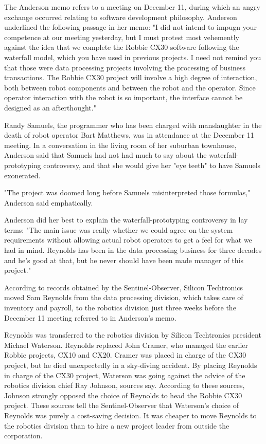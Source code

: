 The Anderson memo refers to a meeting on December 11, during which an angry exchange occurred relating to software development philosophy. Anderson underlined the following passage in her memo: "I did not intend to impugn your competence at our meeting yesterday, but I must protest most vehemently against the idea that we complete the Robbie CX30 software following the waterfall model, which you have used in previous projects. I need not remind you that those were data processing projects involving the processing of business transactions. The Robbie CX30 project will involve a high degree of interaction, both between robot components and between the robot and the operator. Since operator interaction with the robot is so important, the interface cannot be designed as an afterthought."

Randy Samuels, the programmer who has been charged with manslaughter in the death of robot operator Bart Matthews, was in attendance at the December 11 meeting. In a conversation in the living room of her suburban townhouse, Anderson said that Samuels had not had much to say about the waterfall-prototyping controversy, and that she would give her "eye teeth" to have Samuels exonerated.

"The project was doomed long before Samuels misinterpreted those formulas," Anderson said emphatically.

Anderson did her best to explain the waterfall-prototyping controversy in lay terms: "The main issue was really whether we could agree on the system requirements without allowing actual robot operators to get a feel for what we had in mind. Reynolds has been in the data processing business for three decades and he's good at that, but he never should have been made manager of this project."

According to records obtained by the Sentinel-Observer, Silicon Techtronics moved Sam Reynolds from the data processing division, which takes care of inventory and payroll, to the robotics division just three weeks before the December 11 meeting referred to in Anderson's memo.

Reynolds was transferred to the robotics division by Silicon Techtronics president Michael Waterson. Reynolds replaced John Cramer, who managed the earlier Robbie projects, CX10 and CX20. Cramer was placed in charge of the CX30 project, but he died unexpectedly in a sky-diving accident. By placing Reynolds in charge of the CX30 project, Waterson was going against the advice of the robotics division chief Ray Johnson, sources say. According to these sources, Johnson strongly opposed the choice of Reynolds to head the Robbie CX30 project. These sources tell the Sentinel-Observer that Waterson's choice of Reynolds was purely a cost-saving decision. It was cheaper to move Reynolds to the robotics division than to hire a new project leader from outside the corporation.

